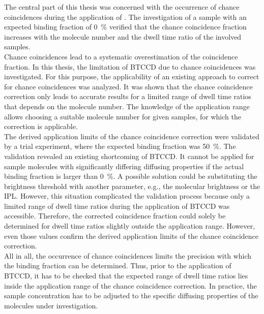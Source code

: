 The central part of this thesis was concerned with the occurrence of chance coincidences during the application of . The investigation of a sample with an expected binding fraction of \SI{0}{\percent} verified that the chance coincidence fraction increases with the molecule number and the dwell time ratio of the involved samples. \\ 

Chance coincidences lead to a systematic overestimation of the coincidence fraction. In this thesis, the limitation of \gls{BTCCD} due to chance coincidences was investigated. For this purpose, the applicability of an existing approach to correct for chance coincidences was analyzed. It was shown that the chance coincidence correction only leads to accurate results for a limited range of dwell time ratios that depends on the molecule number. The knowledge of the application range allows choosing a suitable molecule number for given samples, for which the correction is applicable. \\

The derived application limits of the chance coincidence correction were validated by a trial experiment, where the expected binding fraction was \SI{50}{\percent}. The validation revealed an existing shortcoming of \gls{BTCCD}. It cannot be applied for sample molecules with significantly differing diffusing properties if the actual binding fraction is larger than \SI{0}{\percent}. A possible solution could be substituting the brightness threshold with another parameter, e.g., the molecular brightness or the \gls{IPL}. However, this situation complicated the validation process because only a limited range of dwell time ratios during the application of \gls{BTCCD} was accessible. Therefore, the corrected coincidence fraction could solely be determined for dwell time ratios slightly outside the application range. However, even those values confirm the derived application limits of the chance coincidence correction. \\

All in all, the occurrence of chance coincidences limits the precision with which the binding fraction can be determined. Thus, prior to the application of \gls{BTCCD}, it has to be checked that the expected range of dwell time ratios lies inside the application range of the chance coincidence correction. In practice, the sample concentration has to be adjusted to the specific diffusing properties of the molecules under investigation. \\

